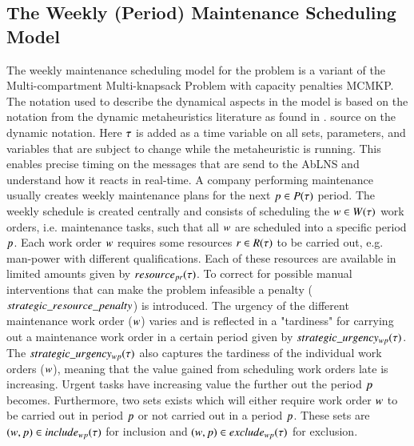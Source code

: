 \subsection{The Weekly (Period) Maintenance Scheduling Model}
The weekly maintenance scheduling model for the problem is a variant of
the  Multi-compartment Multi-knapsack Problem with capacity penalties MCMKP.
The notation used to describe the dynamical aspects in the model is based
on the notation from the dynamic metaheuristics literature as found in
\cite{yangMetaheuristicsDynamicCombinatorial2013}. %
source on the dynamic notation. Here $\tau$ is added as a time variable
on all sets, parameters, and variables that are subject to change while the
metaheuristic is running. This enables precise timing on the messages that
are send to the AbLNS and understand how it reacts in real-time. A company
performing maintenance usually creates weekly maintenance plans for the
next $p \in P(\tau)$ period. The weekly schedule is created
centrally and consists of scheduling the $\ElementWorkOrder \in \SetWorkOrder$
work orders, i.e. maintenance tasks, such that all $w$
are scheduled into a specific period $p$. Each work order $
w$ requires some resources $r \in R(\tau)$
to be carried out, e.g. man-power with different qualifications. Each of these
resources are available in limited amounts given by $\ParStrategicResource$.
To correct for possible manual interventions that can make the problem
infeasible a penalty ( $strategic\_resource\_penalty$) is introduced.
The urgency of the different maintenance work order ($w$)
varies and is reflected in a "tardiness" for carrying out a maintenance
work order in a certain period given by $strategic\_urgency_{w p}(\tau)$. The $
strategic\_urgency_{w p}(\tau)$ also captures the tardiness of the individual work orders
($w$), meaning that the value gained from scheduling work
orders late is increasing. Urgent tasks have increasing value the further out
the period $p$ becomes. Furthermore, two sets exists which will
either require work order $w$ to be carried out in period $
p$ or not carried out in a period $p$. These sets are
$(w,p) \in include_{wp}(\tau)$ for inclusion and
$(w, p) \in exclude_{wp}(\tau)$ for exclusion.


\strategicmodel[clustering=true, beta=false]

